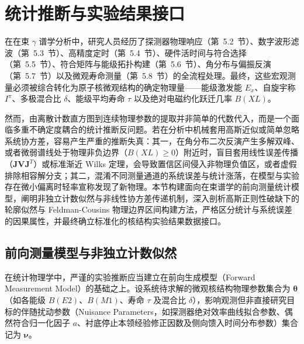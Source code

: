 \section{统计推断与实验结果接口}\label{sec:5-10}

在在束 $\gamma$ 谱学分析中，研究人员经历了探测器物理响应（第~5.2~节）、数字波形滤波（第~5.3~节）、高精度定时（第~5.4~节）、硬件活时间与符合选择（第~5.5~节）、符合矩阵与能级拓扑构建（第~5.6~节）、角分布与偏振反演（第~5.7~节）以及微观寿命测量（第~5.8~节）的全流程处理。最终，这些宏观测量必须被综合转化为原子核微观结构的确定物理量——能级激发能 $E_x$、自旋宇称 $I^\pi$、多极混合比 $\delta$、能级平均寿命 $\tau$ 以及绝对电磁约化跃迁几率 $B(XL)$。

然而，由离散计数直方图到连续物理参数的提取并非简单的代数代入，而是一个面临多重不确定度耦合的统计推断反问题。若在分析中机械套用高斯近似或简单忽略系统协方差，容易产生严重的推断失真：其一，在角分布二次反演产生多解双峰、或者微弱谱线处于物理非负边界（$B(XL) \ge 0$）附近时，盲目套用线性误差传播（$\mathbf{J} \mathbf{V} \mathbf{J}^T$）或标准渐近 Wilks 定理，会导致置信区间侵入非物理负值区，或者虚假排除相容解分支；其二，混淆不同测量通道的系统误差与统计涨落，在模型与实验存在微小偏离时轻率宣称发现了新物理。本节构建面向在束谱学的前向测量统计模型，阐明非独立计数似然与非线性协方差传递机制，深入剖析高斯正则性破缺下的轮廓似然与 Feldman-Cousins 物理边界区间构建方法，严格区分统计与系统误差的因果属性，并最终确立标准化的核结构实验结果数据接口。

\subsection{前向测量模型与非独立计数似然}\label{subsec:5-10-1}

在统计物理学中，严谨的实验推断应当建立在前向生成模型（Forward Measurement Model）的基础之上。设系统待求解的微观核结构物理参数集合为 $\boldsymbol{\theta}$（如各能级 $B(E2)$、$B(M1)$、寿命 $\tau$ 及混合比 $\delta$），影响观测但非直接研究目标的伴随扰动参数（Nuisance Parameters，如探测器绝对效率曲线拟合参数、偶然符合归一化因子 $a$、衬底停止本领经验修正因数及侧向馈入时间分布参数）集合记为 $\boldsymbol{\nu}$。

